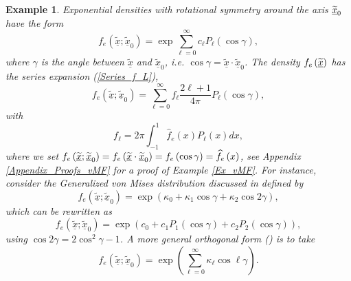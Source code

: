 \documentclass[preprint,11pt,a4paper]{elsarticle}
\newtheorem{example}[theorem]{Example}
\begin{document}
\begin{example}
Exponential densities with rotational symmetry around the axis $\underline{%
\widetilde{x}}_{0}$ have the form 
\begin{equation}
f_{e}\left( \underline{\widetilde{x}};\underline{\widetilde{x}}_{0}\right)
=\exp\sum_{\ell=0}^{\infty}c_{\ell}P_{\ell}\left( \cos\gamma\right) ,
\label{exp_Legrange}
\end{equation}
where $\gamma$ is the angle between $\underline{\widetilde{x}}$ and $%
\underline{\widetilde{x}}_{0}$, i.e. $\cos\gamma=\underline{\widetilde{x}}%
\cdot\underline{\widetilde{x}}_{0}$. The density $f_{e}\left( \underline{%
\widetilde{x}}\right) $ has the series expansion (\ref{Series_f_L}), 
\begin{equation*}
f_{e}\left( \underline{\widetilde{x}};\underline{\widetilde{x}}_{0}\right)
=\sum_{\ell=0}^{\infty}f_{\ell}\frac{2\ell+1}{4\pi}P_{\ell}\left( \cos
\gamma\right) ,
\end{equation*}
with%
\begin{equation*}
f_{\ell}=2\pi\int_{-1}^{1}\widehat{f}_{e}\left( x\right) P_{\ell}\left(
x\right) dx,
\end{equation*}
where we set $f_{e}\left( \underline{\widetilde{x}};\underline{\widetilde{x}}%
_{0}\right) =f_{e}\left( \underline{\widetilde{x}}\cdot \underline{%
\widetilde{x}}_{0}\right) =f_{e}\left( \cos\gamma\right) =\widehat{f}%
_{e}\left( x\right) $, see Appendix \ref{Appendix_Proofs_vMF} for a proof of
Example \ref{Ex_vMF}. \newline
For instance, consider the Generalized von Mises distribution discussed in 
\cite{gatto2007generalized} defined by 
\begin{equation*}
f_{e}\left( \underline{\widetilde{x}};\underline{\widetilde{x}}_{0}\right)
=\exp\left( \kappa_{0}+\kappa_{1}\cos\gamma+\kappa_{2}\cos2\gamma\right) ,
\end{equation*}
which can be rewritten as%
\begin{equation*}
f_{e}\left( \underline{\widetilde{x}};\underline{\widetilde{x}}_{0}\right)
=\exp\left( c_{0}+c_{1}P_{1}\left( \cos\gamma\right) +c_{2}P_{2}\left(
\cos\gamma\right) \right) ,
\end{equation*}
using $\cos2\gamma=2\cos^{2}\gamma-1$. A more general orthogonal form (\cite%
{maksimov1967necessary}) is to take 
\begin{equation*}
f_{e}\left( \underline{\widetilde{x}};\underline{\widetilde{x}}_{0}\right)
=\exp\left( \sum_{\ell=0}^{\infty}\kappa_{\ell}\cos\ell\gamma\right) .

\end{equation*}
\end{example}
\end{document}
